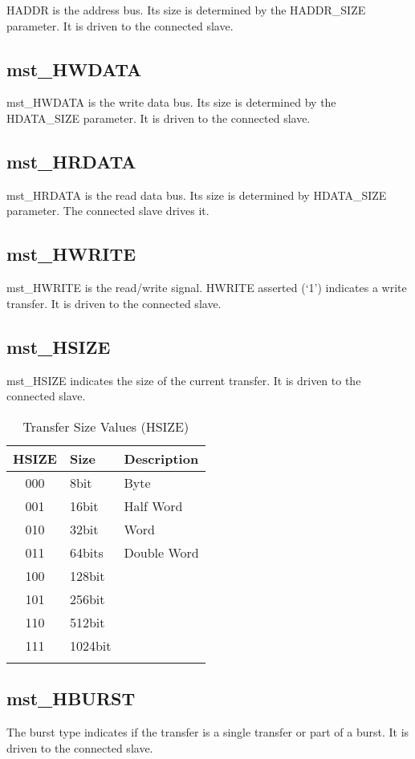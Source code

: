 HADDR is the address bus. Its size is determined by the HADDR\_SIZE
parameter. It is driven to the connected slave.

\subsection{mst\_HWDATA}\label{mst_hwdata}

mst\_HWDATA is the write data bus. Its size is determined by the
HDATA\_SIZE parameter. It is driven to the connected slave.

\subsection{mst\_HRDATA}\label{mst_hrdata}

mst\_HRDATA is the read data bus. Its size is determined by HDATA\_SIZE
parameter. The connected slave drives it.

\subsection{mst\_HWRITE}\label{mst_hwrite}

mst\_HWRITE is the read/write signal. HWRITE asserted (`1') indicates a
write transfer. It is driven to the connected slave.

\subsection{mst\_HSIZE}\label{mst_hsize}

mst\_HSIZE indicates the size of the current transfer. It is driven to
the connected slave.

\begin{longtable}[]{@{}cll@{}}
\toprule
HSIZE & Size & Description\tabularnewline
\midrule
\endhead
000 & 8bit & Byte\tabularnewline
001 & 16bit & Half Word\tabularnewline
010 & 32bit & Word\tabularnewline
011 & 64bits & Double Word\tabularnewline
100 & 128bit &\tabularnewline
101 & 256bit &\tabularnewline
110 & 512bit &\tabularnewline
111 & 1024bit &\tabularnewline
\bottomrule
\caption{Transfer Size Values (HSIZE)}
\end{longtable}


\subsection{mst\_HBURST}\label{mst_hburst}

The burst type indicates if the transfer is a single transfer or part of
a burst. It is driven to the connected slave.

